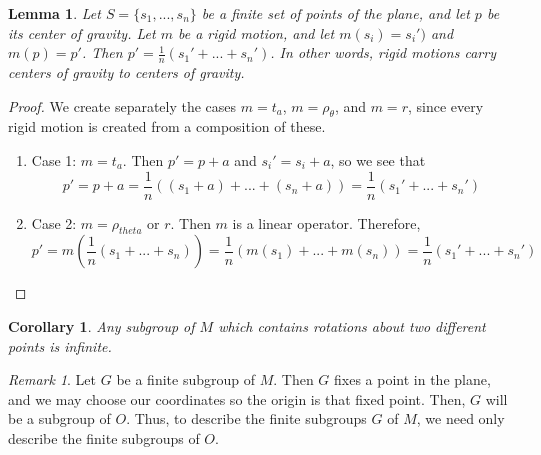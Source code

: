 \documentclass[12pt]{article}
\newtheorem{lem}[thm]{Lemma}  %
\newtheorem{cor}[thm]{Corollary}
\theoremstyle{definition}
\theoremstyle{remark}
\newtheorem{rmk}[thm]{Remark}
\numberwithin{equation}{section}
\begin{document}
\begin{lem}
        Let $S = \{s_1,...,s_n\}$ be a finite set of points of the plane, and let $p$ be its center of gravity. Let $m$ be a rigid motion, and let $m(s_i) = s_i')$ and $m(p) = p'$. Then $p' = \frac{1}{n}(s_1'+...+s_n')$. In other words, rigid motions carry centers of gravity to centers of gravity.
\end{lem}

\begin{proof}
        We create separately the cases $m = t_a$, $m = \rho_{\theta}$, and $m =r$, since every rigid motion is created from a composition of these.\begin{enumerate}
                \item[] Case 1: $m = t_a$. Then $p' = p+a$ and $s_i' = s_i + a$, so we see that \begin{equation}
                                p' = p+a = \frac{1}{n}((s_1+a)+...+(s_n+a)) = \frac{1}{n}(s_1'+...+s_n')
                        \end{equation}
                \item[] Case 2: $m = \rho_{theta}$ or $r$. Then $m$ is a linear operator. Therefore, \begin{equation}
                                p' = m(\frac{1}{n}(s_1+...+s_n)) = \frac{1}{n}(m(s_1)+...+m(s_n)) = \frac{1}{n}(s_1'+...+s_n')
                \end{equation}
        \end{enumerate}
\end{proof}



\vspace{15pt}


\begin{cor}
        Any subgroup of $M$ which contains rotations about two different points is infinite.
\end{cor}

\vspace{15pt}

\begin{rmk}
        Let $G$ be a finite subgroup of $M$. Then $G$ fixes a point in the plane, and we may choose our coordinates so the origin is that fixed point. Then, $G$ will be a subgroup of $O$. Thus, to describe the finite subgroups $G$ of $M$, we need only describe the finite subgroups of $O$.
\end{rmk}

\vspace{15pt}
\end{document}
